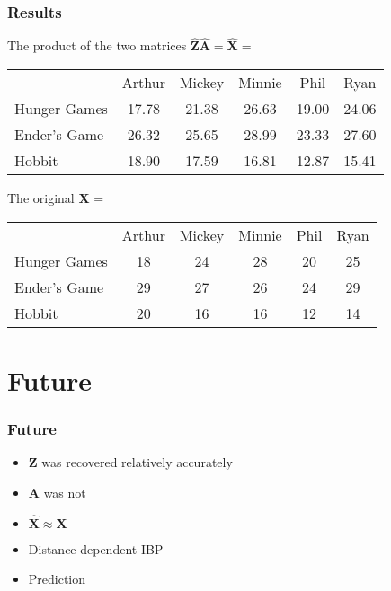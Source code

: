 \documentclass{beamer}
\def\wl{\par \vspace{\baselineskip}}
\begin{document}
  \begin{frame}
  \frametitle{Results}
    The product of the two matrices $\bm{\hat{Z}}\bm{\hat{A}}=\bm{\hat X}=$ \\
       \begin{tabular}{l|c|c|c|c|c|}
         \multicolumn{1}{c}{}
           & \multicolumn{1}{c}{Arthur} 
           & \multicolumn{1}{c}{Mickey} 
           & \multicolumn{1}{c}{Minnie}
           & \multicolumn{1}{c}{Phil} 
           & \multicolumn{1}{c}{Ryan} \\ 
         \cline{2-6}

         Hunger Games &17.78&21.38&26.63&19.00&24.06 \\ \cline{2-6}
         Ender's Game &26.32&25.65&28.99&23.33&27.60 \\ \cline{2-6}
         Hobbit       &18.90&17.59&16.81&12.87&15.41 \\ \cline{2-6}
       \end{tabular}
     \wl
     The original $\bm X$ = \\
       \begin{tabular}{l|c|c|c|c|c|}
         \multicolumn{1}{c}{}
           & \multicolumn{1}{c}{Arthur} 
           & \multicolumn{1}{c}{Mickey} 
           & \multicolumn{1}{c}{Minnie}
           & \multicolumn{1}{c}{Phil} 
           & \multicolumn{1}{c}{Ryan} \\ 
         \cline{2-6}

         Hunger Games & 18 & 24 & 28 & 20 & 25 \\ \cline{2-6}
         Ender's Game & 29 & 27 & 26 & 24 & 29 \\ \cline{2-6}
         Hobbit       & 20 & 16 & 16 & 12 & 14 \\ \cline{2-6}
       \end{tabular}
  \end{frame}


  \section{Future}
  \begin{frame}
  \frametitle{Future}
    \begin{itemize}
      \item $\bm Z$ was recovered relatively accurately
      \item $\bm A$ was not
      \item $\bm{\hat X} \approx \bm X$ 
      \item Distance-dependent IBP
      \item Prediction
    \end{itemize}

  \end{frame}
\end{document}
